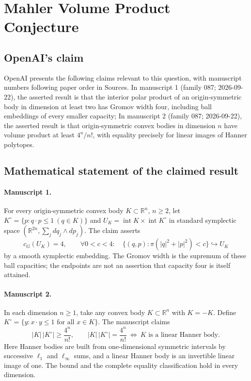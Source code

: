 \documentclass[11pt]{article}
\begin{document}
\section*{Mahler Volume Product Conjecture}

\subsection{OpenAI's claim}
OpenAI presents the following claims relevant to this question, with manuscript numbers following paper order in Sources. In manuscript 1 (family 087; 2026-09-22), the asserted result is that the interior polar product of an origin-symmetric body in dimension at least two has Gromov width four, including ball embeddings of every smaller capacity; In manuscript 2 (family 087; 2026-09-22), the asserted result is that origin-symmetric convex bodies in dimension $n$ have volume product at least $4^n/n!$, with equality precisely for linear images of Hanner polytopes.

\subsection{Mathematical statement of the claimed result}
\paragraph{Manuscript 1.}
For every origin-symmetric convex body $K\subset\mathbb R^n$, $n\ge2$, let $K^{\circ}=\{p:q\cdot p\le1\ (q\in K)\}$ and $U_K=\operatorname{int}K\times\operatorname{int}K^{\circ}$ in standard symplectic space $(\mathbb R^{2n},\sum_jdq_j\wedge dp_j)$. The claim asserts
\[
 c_G(U_K)=4,\qquad
 \forall0<c<4:\quad\{(q,p):\pi(|q|^2+|p|^2)<c\}\hookrightarrow U_K
\]
by a smooth symplectic embedding. The Gromov width is the supremum of these ball capacities; the endpoints are not an assertion that capacity four is itself attained.

\paragraph{Manuscript 2.}
In each dimension $n\ge1$, take any convex body $K\subset\mathbb R^n$ with $K=-K$. Define $K^{\circ}=\{y:x\cdot y\le1\text{ for all }x\in K\}$. The manuscript claims
\[
 |K|\,|K^{\circ}|\ge\frac{4^n}{n!},\qquad
 |K|\,|K^{\circ}|=\frac{4^n}{n!}\ \Longleftrightarrow\
 K\text{ is a linear Hanner body}.
\]
Here Hanner bodies are built from one-dimensional symmetric intervals by successive $\ell_1$ and $\ell_{\infty}$ sums, and a linear Hanner body is an invertible linear image of one. The bound and the complete equality classification hold in every dimension.
\end{document}
